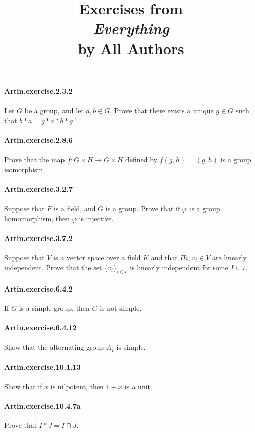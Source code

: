 \documentclass{article}
\title{\textbf{
Exercises from \\
\textit{Everything} \\
by All Authors
}}
\date{}
\begin{document}
\maketitle

\paragraph{Artin.exercise.2.3.2} Let $G$ be a group, and let $a, b \in G$. Prove that there exists a unique $g \in G$ such that $b*a = g * a * b * g⁻¹$.

\paragraph{Artin.exercise.2.8.6} Prove that the map $f : G × H → G × H$ defined by $f(g, h) = (g, h)$ is a group isomorphism.

\paragraph{Artin.exercise.3.2.7} Suppose that $F$ is a field, and $G$ is a group. Prove that if $φ$ is a group homomorphism, then $φ$ is injective.

\paragraph{Artin.exercise.3.7.2} Suppose that $V$ is a vector space over a field $K$ and that $Π i, v_i ∈ V$ are linearly independent. Prove that the set $\{v_i\}_{i\in I}$ is linearly independent for some $I ⊆ ι$.

\paragraph{Artin.exercise.6.4.2} If $G$ is a simple group, then $G$ is not simple.

\paragraph{Artin.exercise.6.4.12} Show that the alternating group $A_7$ is simple.

\paragraph{Artin.exercise.10.1.13} Show that if $x$ is nilpotent, then $1 + x$ is a unit.

\paragraph{Artin.exercise.10.4.7a} Prove that $I * J = I ⊓ J$.
\end{document}
